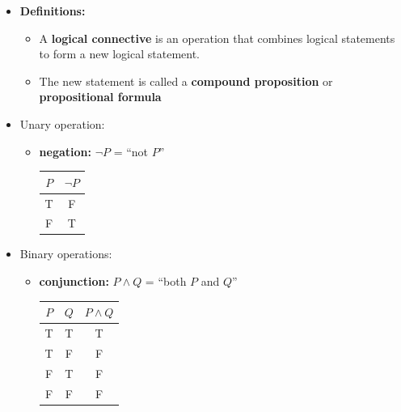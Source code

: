 \documentclass[11pt,twoside]{report}
\begin{document}
\begin{itemize}

\item \textbf{Definitions:} 
\begin{itemize}
\item A \textbf{logical connective}  is an operation that combines logical statements to form a new logical statement. 
\item The new statement is called a \textbf{compound proposition} or \textbf{propositional formula} 
\end{itemize}


\item   Unary operation: 
\begin{itemize}
\item  \textbf{negation:}  $\neg P  $ = ``not $P$''
\begin{center}
  \begin{tabular}{|c|c|}
  \hline
  $P$ & $\neg P$ \\
  \hline
  T & F \\
  F & T \\
  \hline
  \end{tabular}
  \end{center} 
 \end{itemize}

\item  Binary operations: %

\begin{itemize}

\item  \textbf{conjunction:} $P \wedge Q $ = ``both $P$ and $Q$'' 
 \begin{center}
  \begin{tabular}{|c|c|c|}
  \hline
  $P$ & $Q$ & $P \wedge Q$ \\
  \hline
  T & T & T \\
  T & F & F \\
  F & T & F \\
  F & F & F \\
  \hline
  \end{tabular}
  \end{center} 

%




\end{itemize}
\end{itemize}
\end{document}
